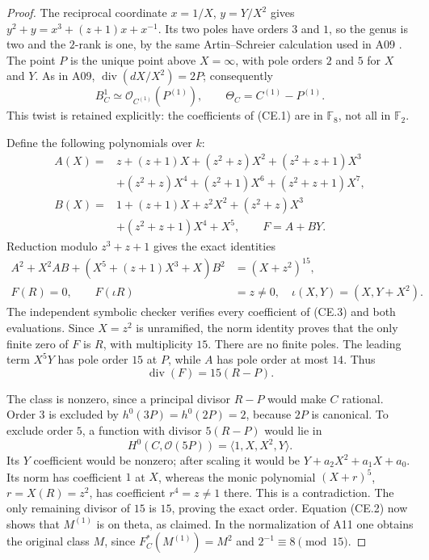 \begin{proof}
The reciprocal coordinate $x=1/X$, $y=Y/X^2$ gives
$y^2+y=x^3+(z+1)x+x^{-1}$. Its two poles have orders $3$ and $1$,
so the genus is two and the $2$-rank is one, by the same
Artin--Schreier calculation used in A09
\cite[Lemma~2.6]{PriesZhu2012}. The point $P$ is the unique point
above $X=\infty$, with pole orders $2$ and $5$ for $X$ and $Y$.
As in A09, $\operatorname{div}(dX/X^2)=2P$; consequently
\[
 B^1_C\simeq\mathcal O_{C^{(1)}}(P^{(1)}),\qquad
 \Theta_C=C^{(1)}-P^{(1)}.
 \tag{CE.2}
\]
This twist is retained explicitly: the coefficients of (CE.1) are
in $\mathbb F_8$, not all in $\mathbb F_2$.

Define the following polynomials over $k$:
\begin{align*}
 A(X)={}&z+(z+1)X+(z^2+z)X^2+(z^2+z+1)X^3\\
        &+(z^2+z)X^4+(z^2+1)X^6+(z^2+z+1)X^7,\\
 B(X)={}&1+(z+1)X+z^2X^2+(z^2+z)X^3\\
        &+(z^2+z+1)X^4+X^5,\qquad F=A+BY.
\end{align*}
Reduction modulo $z^3+z+1$ gives the exact identities
\begin{align}
 A^2+X^2AB+(X^5+(z+1)X^3+X)B^2&=(X+z^2)^{15},
 \tag{CE.3}\\
 F(R)=0,\qquad F(\iota R)&=z\ne0,
 \quad\iota(X,Y)=(X,Y+X^2).
 \tag{CE.4}
\end{align}
The independent symbolic checker verifies every coefficient of
(CE.3) and both evaluations. Since $X=z^2$ is unramified, the norm
identity proves that the only finite zero of $F$ is $R$, with
multiplicity $15$. There are no finite poles. The leading term
$X^5Y$ has pole order $15$ at $P$, while $A$ has pole order at
most $14$. Thus
\[
                       \operatorname{div}(F)=15(R-P).
 \tag{CE.5}
\]

The class is nonzero, since a principal divisor $R-P$ would make
$C$ rational. Order $3$ is excluded by
$h^0(3P)=h^0(2P)=2$, because $2P$ is canonical. To exclude order
$5$, a function with divisor $5(R-P)$ would lie in
\[
 H^0(C,\mathcal O(5P))=\langle1,X,X^2,Y\rangle.
\]
Its $Y$ coefficient would be nonzero; after scaling it would be
$Y+a_2X^2+a_1X+a_0$. Its norm has coefficient $1$ at $X$, whereas
the monic polynomial $(X+r)^5$, $r=X(R)=z^2$, has coefficient
$r^4=z\ne1$ there. This is a contradiction. The only remaining
divisor of $15$ is $15$, proving the exact order. Equation (CE.2)
now shows that $M^{(1)}$ is on theta, as claimed. In the normalization
of A11 one obtains the original class $M$, since
$F_C^*(M^{(1)})=M^2$ and $2^{-1}\equiv8\pmod{15}$.


\end{proof}

